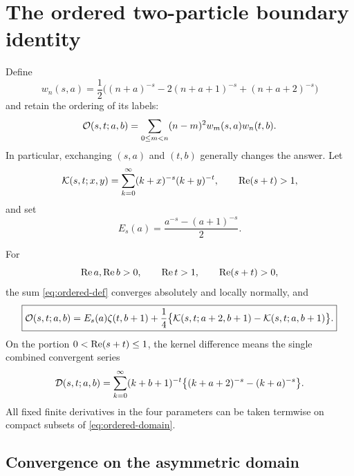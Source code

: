 \section{The ordered two-particle boundary identity}
\label{sec:ordered}

Define
\begin{equation}\label{eq:weight-two}
 w_n(s,a)=\frac12\bigl((n+a)^{-s}-2(n+a+1)^{-s}
                           +(n+a+2)^{-s}\bigr)
\end{equation}
and retain the ordering of its labels:
\begin{equation}\label{eq:ordered-def}
 \mathcal O(s,t;a,b)=\sum_{0\le m<n}(n-m)^2w_m(s,a)w_n(t,b).
\end{equation}
In particular, exchanging $(s,a)$ and $(t,b)$ generally changes the
answer. Let
\begin{equation}\label{eq:kernel-def}
 \mathcal K(s,t;x,y)=\sum_{k=0}^{\infty}(k+x)^{-s}(k+y)^{-t},
 \qquad \operatorname{Re}(s+t)>1,
\end{equation}
and set
\begin{equation}\label{eq:boundary-coefficient}
 E_s(a)=\frac{a^{-s}-(a+1)^{-s}}2.
\end{equation}

\begin{theorem}\label{thm:ordered}
For
\begin{equation}\label{eq:ordered-domain}
 \operatorname{Re} a,\operatorname{Re} b>0,\qquad \operatorname{Re} t>1,\qquad \operatorname{Re}(s+t)>0,
\end{equation}
the sum \eqref{eq:ordered-def} converges absolutely and locally
normally, and
\begin{equation}\label{eq:ordered-main}
 \boxed{\mathcal O(s,t;a,b)=E_s(a)\zeta(t,b+1)
 +\frac14\bigl\{\mathcal K(s,t;a+2,b+1)-\mathcal K(s,t;a,b+1)\bigr\}.}
\end{equation}
On the portion $0<\operatorname{Re}(s+t)\le1$, the kernel difference means the
single combined convergent series
\begin{equation}\label{eq:kernel-difference}
 \mathcal D(s,t;a,b)=\sum_{k=0}^{\infty}(k+b+1)^{-t}
                  \bigl\{(k+a+2)^{-s}-(k+a)^{-s}\bigr\}.
\end{equation}
All fixed finite derivatives in the four parameters can be taken
termwise on compact subsets of \eqref{eq:ordered-domain}.
\end{theorem}

\subsection{Convergence on the asymmetric domain}

